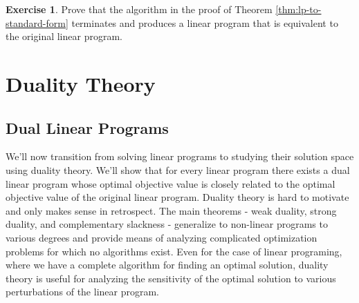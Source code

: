 \documentclass[
]{book}
\theoremstyle{definition}
\theoremstyle{definition}
\theoremstyle{definition}
\newtheorem{exercise}{Exercise}[chapter]
\theoremstyle{definition}
\theoremstyle{remark}
\begin{document}
\begin{exercise}
\protect\hypertarget{exr:lp-to-standard-form}{}\label{exr:lp-to-standard-form}Prove that the algorithm in the proof of Theorem \ref{thm:lp-to-standard-form} terminates and produces a linear program that is equivalent to the original linear program.
\end{exercise}

\hypertarget{part-duality-theory}{%
\part{Duality Theory}\label{part-duality-theory}}

\hypertarget{dual-linear-programs}{%
\chapter{Dual Linear Programs}\label{dual-linear-programs}}

We'll now transition from solving linear programs to studying their solution space using duality
theory. We'll show that for every linear program there exists a dual linear program whose optimal
objective value is closely related to the optimal objective value of the original linear program.
Duality theory is hard to motivate and only makes sense in retrospect. The main theorems - weak duality,
strong duality, and complementary slackness - generalize to non-linear programs to various degrees
and provide means of analyzing complicated optimization problems for which no algorithms exist. Even
for the case of linear programing, where we have a complete algorithm for finding an optimal solution,
duality theory is useful for analyzing the sensitivity of the optimal solution to various
perturbations of the linear program.
\end{document}
